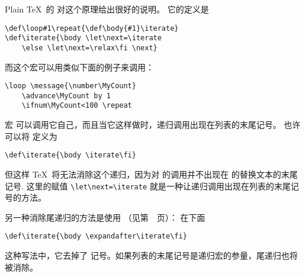 \documentclass{book}
\begin{document}
Plain \TeX\ 的  对这个原理给出很好的说明。
\label{loop:ex}它的定义是
\begin{verbatim}
\def\loop#1\repeat{\def\body{#1}\iterate}
\def\iterate{\body \let\next=\iterate
    \else \let\next=\relax\fi \next}
\end{verbatim}
而这个宏可以用类似下面的例子来调用：
\begin{verbatim}
\loop \message{\number\MyCount}
    \advance\MyCount by 1
    \ifnum\MyCount<100 \repeat
\end{verbatim}
宏  可以调用它自己，而且当它这样做时，递归调用出现在列表的末尾记号。
也许可以将  定义为
\begin{verbatim}
\def\iterate{\body \iterate\fi}
\end{verbatim}
但这样 \TeX\ 将无法消除这个递归，因为对  的调用并不出现在
 的替换文本的末尾记号. 这里的赋值 \verb>\let\next=\iterate>
就是一种让递归调用出现在列表的末尾记号的方法。

另一种消除尾递归的方法是使用 （见第~\pageref{after:cond}~页）：
在下面
\begin{verbatim}
\def\iterate{\body \expandafter\iterate\fi}
\end{verbatim}
这种写法中，它去掉了  记号。如果列表的末尾记号是递归宏的参量，尾递归也将被消除。
\end{document}
